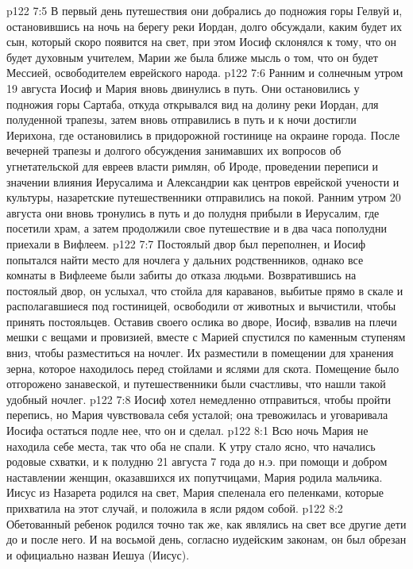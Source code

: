 \vs p122 7:5 В первый день путешествия они добрались до подножия горы Гелвуй и, остановившись на ночь на берегу реки Иордан, долго обсуждали, каким будет их сын, который скоро появится на свет, при этом Иосиф склонялся к тому, что он будет духовным учителем, Марии же была ближе мысль о том, что он будет Мессией, освободителем еврейского народа.
\vs p122 7:6 Ранним и солнечным утром 19 августа Иосиф и Мария вновь двинулись в путь. Они остановились у подножия горы Сартаба, откуда открывался вид на долину реки Иордан, для полуденной трапезы, затем вновь отправились в путь и к ночи достигли Иерихона, где остановились в придорожной гостинице на окраине города. После вечерней трапезы и долгого обсуждения занимавших их вопросов об угнетательской для евреев власти римлян, об Ироде, проведении переписи и значении влияния Иерусалима и Александрии как центров еврейской учености и культуры, назаретские путешественники отправились на покой. Ранним утром 20 августа они вновь тронулись в путь и до полудня прибыли в Иерусалим, где посетили храм, а затем продолжили свое путешествие и в два часа пополудни приехали в Вифлеем.
\vs p122 7:7 Постоялый двор был переполнен, и Иосиф попытался найти место для ночлега у дальних родственников, однако все комнаты в Вифлееме были забиты до отказа людьми. Возвратившись на постоялый двор, он услыхал, что стойла для караванов, выбитые прямо в скале и располагавшиеся под гостиницей, освободили от животных и вычистили, чтобы принять постояльцев. Оставив своего ослика во дворе, Иосиф, взвалив на плечи мешки с вещами и провизией, вместе с Марией спустился по каменным ступеням вниз, чтобы разместиться на ночлег. Их разместили в помещении для хранения зерна, которое находилось перед стойлами и яслями для скота. Помещение было отгорожено занавеской, и путешественники были счастливы, что нашли такой удобный ночлег.
\vs p122 7:8 Иосиф хотел немедленно отправиться, чтобы пройти перепись, но Мария чувствовала себя усталой; она тревожилась и уговаривала Иосифа остаться подле нее, что он и сделал.
\vs p122 8:1 Всю ночь Мария не находила себе места, так что оба не спали. К утру стало ясно, что начались родовые схватки, и к полудню 21 августа 7 года до н.э. при помощи и добром наставлении женщин, оказавшихся их попутчицами, Мария родила мальчика. Иисус из Назарета родился на свет, Мария спеленала его пеленками, которые прихватила на этот случай, и положила в ясли рядом собой.
\vs p122 8:2 Обетованный ребенок родился точно так же, как являлись на свет все другие дети до и после него. И на восьмой день, согласно иудейским законам, он был обрезан и официально назван Иешуа (Иисус).
